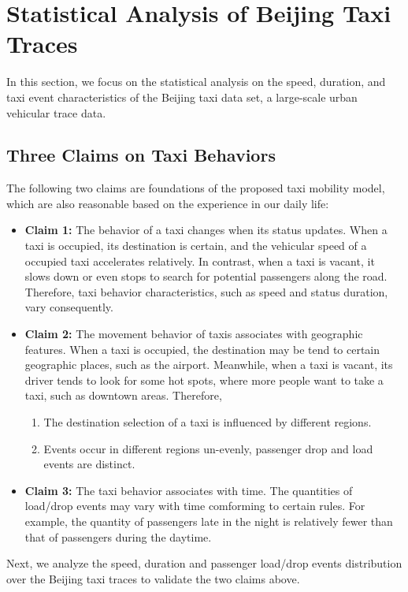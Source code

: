 \documentclass[10pt,conference,compsocconf,letterpaper]{IEEEtran}
\begin{document}




\section{Statistical Analysis of Beijing Taxi Traces}
\label{section_assumptions_anlysis}

In this section, we focus on the statistical analysis on the speed, duration, and taxi event characteristics of the Beijing taxi data set, a large-scale urban vehicular trace data.



\subsection{Three Claims on Taxi Behaviors}
\label{section_statistic_analysis}

The following two claims are foundations of the proposed taxi mobility model, which are also reasonable based on the experience in our daily life:
\begin{itemize}
  \item \textbf{Claim 1:} The behavior of a taxi changes when its status updates. When a taxi is occupied, its destination is certain, and the vehicular speed of a occupied taxi accelerates relatively. In contrast, when a taxi is vacant, it slows down or even stops to search for potential passengers along the road. Therefore, taxi behavior characteristics, such as speed and status duration, vary consequently.

  \item \textbf{Claim 2:} The movement behavior of taxis associates with geographic features. When a taxi is occupied, the destination may be tend to certain geographic places, such as the airport. Meanwhile, when a taxi is vacant, its driver tends to look for some hot spots, where more people want to take a taxi, such as downtown areas. Therefore,
      \begin{enumerate}
        \item The destination selection of a taxi is influenced by different regions.
        \item Events occur in different regions un-evenly, passenger drop and load events are distinct.
      \end{enumerate}
 \item \textbf{Claim 3:} The taxi behavior associates with time. The quantities of load/drop events may vary with time comforming to certain rules. For example, the quantity of passengers late in the night is relatively fewer than that of passengers during the daytime. 
\end{itemize}
Next, we analyze the speed, duration and passenger load/drop events distribution over the Beijing taxi traces to validate the two claims above.
\end{document}
